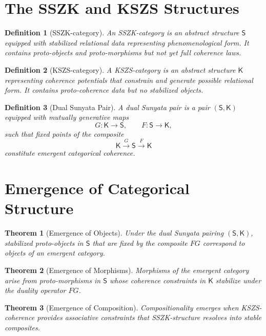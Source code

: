 \documentclass[11pt]{article}
\newtheorem{definition}{Definition}
\newtheorem{theorem}{Theorem}
\begin{document}
\section{The SSZK and KSZS Structures}

\begin{definition}[SSZK-category]
An SSZK-category is an abstract structure $\mathsf{S}$ equipped with stabilized relational data representing phenomenological form. It contains proto-objects and proto-morphisms but not yet full coherence laws.
\end{definition}

\begin{definition}[KSZS-category]
A KSZS-category is an abstract structure $\mathsf{K}$ representing coherence potentials that constrain and generate possible relational form. It contains proto-coherence data but no stabilized objects.
\end{definition}

\begin{definition}[Dual Sunyata Pair]
A dual Sunyata pair is a pair $(\mathsf{S}, \mathsf{K})$ equipped with mutually generative maps
$$ G: \mathsf{K} \to \mathsf{S}, \qquad F: \mathsf{S} \to \mathsf{K}, $$
such that fixed points of the composite
$$ \mathsf{K} \xrightarrow{G} \mathsf{S} \xrightarrow{F} \mathsf{K} $$
constitute emergent categorical coherence.
\end{definition}

\section{Emergence of Categorical Structure}

\begin{theorem}[Emergence of Objects]
Under the dual Sunyata pairing $(\mathsf{S},\mathsf{K})$, stabilized proto-objects in $\mathsf{S}$ that are fixed by the composite $FG$ correspond to objects of an emergent category.
\end{theorem}

\begin{theorem}[Emergence of Morphisms]
Morphisms of the emergent category arise from proto-morphisms in $\mathsf{S}$ whose coherence constraints in $\mathsf{K}$ stabilize under the duality operator $FG$.
\end{theorem}

\begin{theorem}[Emergence of Composition]
Compositionality emerges when KSZS-coherence provides associative constraints that SSZK-structure resolves into stable composites.
\end{theorem}
\end{document}
